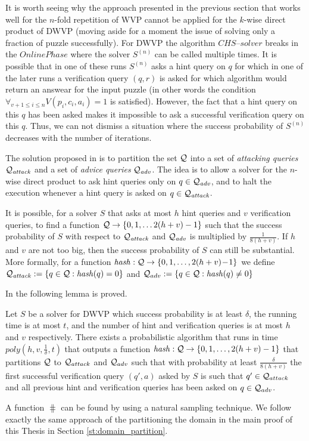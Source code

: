 It is worth seeing why the approach presented in the previous section that works well for the $n$-fold repetition of WVP
cannot be applied for the $k$-wise direct product of DWVP (moving aside for a moment the issue of solving only a fraction of puzzle successfully).
For DWVP the algorithm $\mathit{CHS\text{--}solver}$ breaks in the $\mathit{OnlinePhase}$ where
the solver $S^{(n)}$ can be called multiple times.
It is possible that in one of these runs $S^{(n)}$ asks a hint query on $q$
for which in one of the later runs a verification query $(q,r)$ is asked
for which algorithm would return an answear for the input puzzle
(in other words the condition $\forall_{v+1 \leq i \leq n} V(p_i, c_i, a_i) = 1$ is satisfied).
However, the fact that a hint query on this $q$ has been asked makes it impossible to ask a successful verification query on this $q$.
Thus, we can not dismiss a situation where the success probability of $S^{(n)}$ decreases with the number of iterations.

The solution proposed in \cite{Dodis:2009:SAI:1530441.1530450} is to partition the set $\mathcal{Q}$ into a set of \textit{attacking queries} $\mathcal{Q}_{\mathit{attack}}$
and a set of \textit{advice queries} $\mathcal{Q}_{\mathit{adv}}$. The idea is to allow a solver for the $n$-wise direct product to ask hint
queries only on $q \in \mathcal{Q}_{\mathit{adv}}$, and to halt the execution whenever a hint query is asked on $q \in \mathcal{Q}_{\mathit{attack}}$.

It is possible, for a solver $S$ that asks at most $h$ hint queries and $v$ verification queries,
to find a function $\mathcal{Q} \rightarrow \{0,1,\dotsc 2(h+v)-1\}$ such that the success probability of $S$ with respect to
$\mathcal{Q}_{\mathit{attack}}$ and $\mathcal{Q}_{\mathit{adv}}$ is multiplied by $\frac{1}{8(h+v)}$.
If $h$ and $v$ are not too big, then the success probability of $S$ can still be substantial.
More formally, for a function $\operatorname{\mathit{hash}}:\mathcal{Q} \rightarrow \{0,1,\dotsc, 2(h+v)\!-\!1 \}$
we define $\mathcal{Q}_{\mathit{attack}} := \{q \in \mathcal{Q} : \operatorname{\mathit{hash}}(q) = 0 \}$ and $\mathcal{Q}_{adv} := \{q \in \mathcal{Q}: \operatorname{\mathit{hash}}(q) \neq 0\}$

In \cite{Dodis:2009:SAI:1530441.1530450} the following lemma is proved.
\begin{lemma}
  \label{lemma:hash_function_previous}
Let $S$ be a solver for DWVP which success probability is at least $\delta$, the running time is at most $t$,
and the number of hint and verification queries is at most $h$ and $v$ respectively.
There exists a probabilistic algorithm that runs in time $poly(h,v,\frac{1}{\delta},t)$
that outputs a function $\operatorname{\mathit{hash}} : \mathcal{Q} \rightarrow \{0,1, \dotsc, 2(h+v)-1\}$
that partitions $\mathcal{Q}$ to $\mathcal{Q}_{attack}$ and $\mathcal{Q}_{adv}$ such that
with probability at least $\frac{\delta}{8(h+v)}$ the first successful verification query $(q',a)$ asked by $S$ is such that $q' \in \mathcal{Q}_{attack}$
and all previous hint and verification queries has been asked on $q \in \mathcal{Q}_{adv}$.
\end{lemma}
A function $\hash$ can be found by using a natural sampling technique.
We follow exactly the same approach of the partitioning the domain in the main proof of this Thesis in Section \ref{st:domain_partition}.

